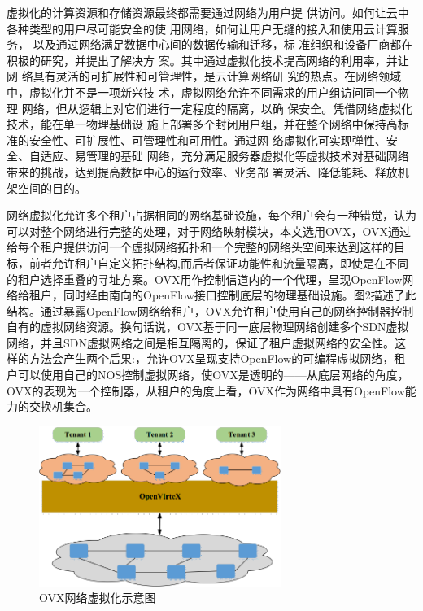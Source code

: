 虚拟化的计算资源和存储资源最终都需要通过网络为用户提
供访问。如何让云中各种类型的用户尽可能安全的使
用网络，如何让用户无缝的接入和使用云计算服务，
以及通过网络满足数据中心间的数据传输和迁移，标
准组织和设备厂商都在积极的研究，并提出了解决方
案。其中通过虚拟化技术提高网络的利用率，并让网
络具有灵活的可扩展性和可管理性，是云计算网络研
究的热点。在网络领域中，虚拟化并不是一项新兴技
术，虚拟网络允许不同需求的用户组访问同一个物理
网络，但从逻辑上对它们进行一定程度的隔离，以确
保安全。凭借网络虚拟化技术，能在单一物理基础设
施上部署多个封闭用户组，并在整个网络中保持高标
准的安全性、可扩展性、可管理性和可用性。通过网
络虚拟化可实现弹性、安全、自适应、易管理的基础
网络，充分满足服务器虚拟化等虚拟技术对基础网络
带来的挑战，达到提高数据中心的运行效率、业务部
署灵活、降低能耗、释放机架空间的目的。

网络虚拟化允许多个租户占据相同的网络基础设施，每个租户会有一种错觉，认为可以对整个网络进行完整的处理，对于网络映射模块，本文选用OVX，OVX通过给每个租户提供访问一个虚拟网络拓扑和一个完整的网络头空间来达到这样的目标，前者允许租户自定义拓扑结构,而后者保证功能性和流量隔离，即使是在不同的租户选择重叠的寻址方案。OVX用作控制信道内的一个代理，呈现OpenFlow网络给租户，同时经由南向的OpenFlow接口控制底层的物理基础设施。图2描述了此结构。通过暴露OpenFlow网络给租户，OVX允许租户使用自己的网络控制器控制自有的虚拟网络资源。换句话说，OVX基于同一底层物理网络创建多个SDN虚拟网络，并且SDN虚拟网络之间是相互隔离的，保证了租户虚拟网络的安全性。这样的方法会产生两个后果:，允许OVX呈现支持OpenFlow的可编程虚拟网络，租户可以使用自己的NOS控制虚拟网络，使OVX是透明的——从底层网络的角度，OVX的表现为一个控制器，从租户的角度上看，OVX作为网络中具有OpenFlow能力的交换机集合。

\begin{figure}[!htb]
  \centering
  \includegraphics[width=0.7\textwidth]{logo/ovx.png}
  \caption{OVX网络虚拟化示意图}
  \label{fig:ovx}
\end{figure}


